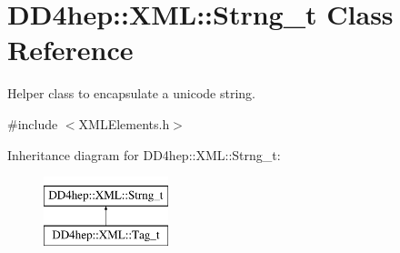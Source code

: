 \hypertarget{class_d_d4hep_1_1_x_m_l_1_1_strng__t}{}\section{D\+D4hep\+:\+:X\+ML\+:\+:Strng\+\_\+t Class Reference}
\label{class_d_d4hep_1_1_x_m_l_1_1_strng__t}


Helper class to encapsulate a unicode string.  




{\ttfamily \#include $<$X\+M\+L\+Elements.\+h$>$}

Inheritance diagram for D\+D4hep\+:\+:X\+ML\+:\+:Strng\+\_\+t\+:\begin{figure}[H]
\begin{center}
\leavevmode
\includegraphics[height=2.000000cm]{class_d_d4hep_1_1_x_m_l_1_1_strng__t}
\end{center}
\end{figure}
